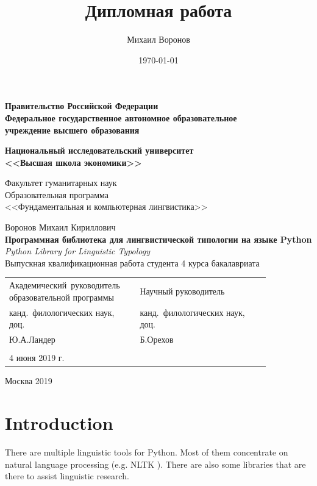 \documentclass[a4paper,12pt]{article}
\author{Михаил Воронов}
\title{Дипломная работа}
\date{\today}
\begin{document}

\newpage
\thispagestyle{empty}
\begin{center}
	\textbf{Правительство Российской Федерации \\
		Федеральное государственное автономное образовательное \\
		учреждение высшего образования}
	\vspace{1cm}
	
	\textbf{Национальный исследовательский университет \\ <<Высшая школа экономики>>}
\end{center}

\vspace{1cm}
\begin{flushright}
	\noindent
	Факультет гуманитарных наук \\
	Образовательная программа \\
	<<Фундаментальная и компьютерная лингвистика>>
\end{flushright}

\begin{center}
	Воронов Михаил Кириллович \\
	\vspace{2ex}
	\textbf{Программная библиотека для лингвистической типологии на языке Python} \\
	\textit{Python Library for Linguistic Typology}\\
	\vspace{3ex}
	Выпускная квалификационная работа студента 4 курса бакалавриата 
\end{center}
\vspace{3ex}
\begin{tabular}{p{0.4\linewidth}p{0.45\linewidth}}
	Академический~руководитель образовательной программы & Научный руководитель \\
	канд.~филологических наук, доц. & канд.~филологических наук, доц.\\
	Ю.А.Ландер & Б.Орехов \\
	& \\ 
	4 июня 2019 г.
\end{tabular}

\begin{center}
	Москва 2019
\end{center}

\newpage

\setcounter{tocdepth}{2}
\tableofcontents

\newpage
\section{Introduction}
There are multiple linguistic tools for Python. Most of them concentrate on natural language processing (e.g. NLTK \parencite{NLTK}). There are also some libraries that are there to assist linguistic research.
\end{document}
